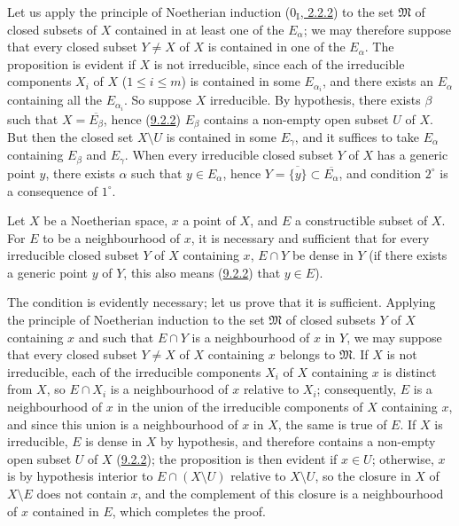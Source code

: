 Let us apply the principle of Noetherian induction
(\hyperref[0.2.2.2]{$0_{\mathrm I}$, 2.2.2}) to the set
$\mathfrak{M}$ of closed subsets of $X$ contained in at least one of the
$E_\alpha$; we may therefore suppose that every closed subset $Y\ne X$ of $X$ is
contained in one of the $E_\alpha$. The proposition is evident if $X$ is not
irreducible, since each of the irreducible components $X_i$ of $X$
($1\leq i\leq m$) is contained in some $E_{\alpha_i}$, and there exists an
$E_\alpha$ containing all the $E_{\alpha_i}$. So suppose $X$
irreducible. By hypothesis, there exists $\beta$ such that
$X=\overline{E_\beta}$, hence (\hyperref[0.9.2.2]{9.2.2}) $E_\beta$
contains a non-empty open subset $U$ of $X$. But then the closed set
$X\setminus U$ is contained in some $E_\gamma$, and it suffices to take
$E_\alpha$ containing $E_\beta$ and $E_\gamma$. When every irreducible
closed subset $Y$ of $X$
has a generic point $y$, there exists $\alpha$ such that $y\in E_\alpha$,
hence $Y=\overline{\{y\}}\subset\overline{E_\alpha}$, and condition
$2^\circ$ is a consequence of $1^\circ$.

\begin{proposition}[9.2.5]
\label{0.9.2.5}
Let $X$ be a Noetherian space, $x$ a point of $X$, and $E$ a constructible
subset of $X$. For $E$ to be a neighbourhood of $x$, it is necessary and
sufficient that for every irreducible closed subset $Y$ of $X$ containing $x$,
$E\cap Y$ be dense in $Y$ (if there exists a generic point $y$ of $Y$,
this also means (\hyperref[0.9.2.2]{9.2.2}) that $y\in E$).
\end{proposition}

The condition is evidently necessary; let us prove that it is sufficient.
Applying the principle of Noetherian induction to the set $\mathfrak{M}$
of closed subsets $Y$ of $X$ containing $x$ and such that $E\cap Y$ is a
neighbourhood of $x$ in $Y$, we may suppose that every closed subset $Y\ne X$
of $X$ containing $x$ belongs to $\mathfrak{M}$. If $X$ is not
irreducible, each of the irreducible components $X_i$ of $X$ containing
$x$ is distinct from $X$, so $E\cap X_i$ is a neighbourhood of $x$
relative to $X_i$; consequently, $E$ is a neighbourhood of $x$ in the union of
the irreducible components of $X$ containing $x$, and since this union is a
neighbourhood of $x$ in $X$, the same is true of $E$. If $X$ is
irreducible, $E$ is dense in $X$ by hypothesis, and therefore contains a
non-empty open subset $U$ of $X$ (\hyperref[0.9.2.2]{9.2.2}); the
proposition is then evident if $x\in U$; otherwise, $x$ is by hypothesis
interior to $E\cap(X\setminus U)$ relative to $X\setminus U$, so the closure in
$X$ of $X\setminus E$ does not contain $x$, and the complement of this
closure is a neighbourhood of $x$ contained in $E$, which completes the
proof.


